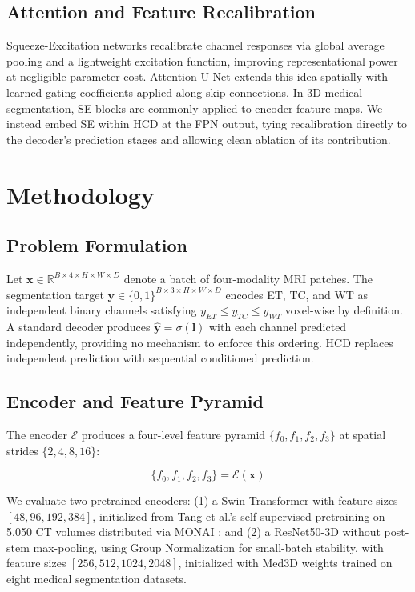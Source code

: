 \documentclass[conference]{IEEEtran}
\begin{document}
\subsection{Attention and Feature Recalibration}
Squeeze-Excitation networks \cite{se_net} recalibrate channel responses
via global average pooling and a lightweight excitation function,
improving representational power at negligible parameter cost. Attention
U-Net \cite{oktay_attunet} extends this idea spatially with learned
gating coefficients applied along skip connections. In 3D medical
segmentation, SE blocks are commonly applied to encoder feature maps.
We instead embed SE within HCD at the FPN output, tying recalibration
directly to the decoder's prediction stages and allowing clean ablation
of its contribution.

\section{Methodology}

\subsection{Problem Formulation}
Let $\mathbf{x} \in \mathbb{R}^{B \times 4 \times H \times W \times D}$
denote a batch of four-modality MRI patches. The segmentation target
$\mathbf{y} \in \{0,1\}^{B \times 3 \times H \times W \times D}$
encodes ET, TC, and WT as independent binary channels satisfying
$y_{ET} \leq y_{TC} \leq y_{WT}$ voxel-wise by definition. A standard
decoder produces $\hat{\mathbf{y}} = \sigma(\mathbf{l})$ with each
channel predicted independently, providing no mechanism to enforce this
ordering. HCD replaces independent prediction with sequential
conditioned prediction.

\subsection{Encoder and Feature Pyramid}
The encoder $\mathcal{E}$ produces a four-level feature pyramid
$\{f_0, f_1, f_2, f_3\}$ at spatial strides $\{2, 4, 8, 16\}$:

\begin{equation}
\{f_0, f_1, f_2, f_3\} = \mathcal{E}(\mathbf{x})
\end{equation}

We evaluate two pretrained encoders: (1) a Swin Transformer
\cite{liu_swin} with feature sizes $[48, 96, 192, 384]$, initialized
from Tang et al.'s self-supervised pretraining on 5{,}050 CT volumes
distributed via MONAI \cite{tang_pretrain};
and (2) a ResNet50-3D \cite{he_resnet} without post-stem max-pooling,
using Group Normalization \cite{wu_groupnorm} for small-batch stability,
with feature sizes $[256, 512, 1024, 2048]$, initialized with Med3D
weights \cite{med3d} trained on eight medical segmentation datasets.
\end{document}
